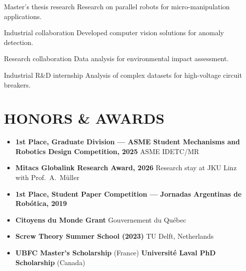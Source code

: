 \documentclass[11pt,oneside,a4paper]{article} %
\begin{document}
{\begin{minipage}{11.3cm}
\vspace*{0.04cm}

{Master's thesis research}
{Research on parallel robots for micro-manipulation applications.}

\vspace*{0.04cm}

{Industrial collaboration}
{Developed computer vision solutions for anomaly detection.}

\vspace*{0.04cm}

{Research collaboration}
{Data analysis for environmental impact assessment.}

\vspace*{0.04cm}

{Industrial R\&D internship}
{Analysis of complex datasets for high-voltage circuit breakers.}

\section*{{\faTrophy}\;HONORS \& AWARDS}
\begin{itemize}[leftmargin=*, itemsep=0ex, topsep=0.2ex]
\footnotesize
\item \textbf{1st Place, Graduate Division --- ASME Student Mechanisms and Robotics Design Competition, 2025} \textperiodcentered{} ASME IDETC/MR
\item \textbf{Mitacs Globalink Research Award, 2026} \textperiodcentered{} Research stay at JKU Linz with Prof.\ A.\ M\"uller
\item \textbf{1st Place, Student Paper Competition --- Jornadas Argentinas de Rob\'otica, 2019}
\item \textbf{Citoyens du Monde Grant} \textperiodcentered{} Gouvernement du Qu\'ebec
\item \textbf{Screw Theory Summer School (2023)} \textperiodcentered{} TU Delft, Netherlands
\item \textbf{UBFC Master's Scholarship} (France) \textperiodcentered{} \textbf{Universit\'e Laval PhD Scholarship} (Canada)
\end{itemize}

\end{minipage}}%
\end{document}
